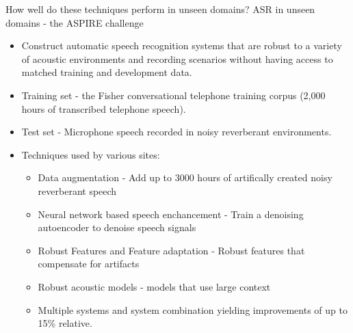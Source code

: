 \begin{frame} {How well do these techniques perform in unseen domains?}
{ASR in unseen domains - the ASPIRE challenge}

\begin{itemize}
\item Construct automatic speech recognition systems that
are robust to a variety of acoustic environments and recording
scenarios \alert{without having access to matched training and
development data}.
\item \alert{Training set}  - the Fisher conversational telephone training corpus (2,000 hours of transcribed telephone speech).
\item \alert{Test set} - Microphone speech recorded in noisy reverberant environments.
\item Techniques used by various sites:
\begin{itemize}
\item Data augmentation - Add up to 3000 hours of artifically created noisy reverberant speech
\item Neural network based speech enchancement - Train a denoising autoencoder to denoise speech signals
\item Robust Features and Feature adaptation - Robust features that compensate for artifacts
\item Robust acoustic models - models that use large context
\item Multiple systems and system combination yielding improvements of up to 15\% relative.
\end{itemize}
\end{itemize}
\end{frame}

